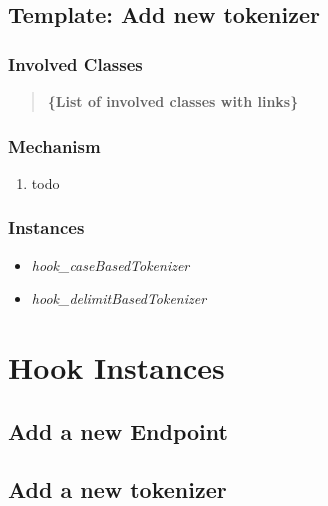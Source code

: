 \documentclass[letterpaper,10pt,english]{sphinxmanual}
\begin{document}
\section{Template: Add new tokenizer}
\label{docs/hooks/t_tokenizer::doc}\label{docs/hooks/t_tokenizer:hook-template-uss}\label{docs/hooks/t_tokenizer:template-add-new-tokenizer}

\subsection{Involved Classes}
\label{docs/hooks/t_tokenizer:involved-classes}\begin{quote}

\textbf{\{List of involved classes with links\}}
\end{quote}


\subsection{Mechanism}
\label{docs/hooks/t_tokenizer:mechanism}\begin{enumerate}
\item {} 
todo

\end{enumerate}


\subsection{Instances}
\label{docs/hooks/t_tokenizer:instances}\begin{itemize}
\item {} 
\emph{hook\_caseBasedTokenizer}

\item {} 
\emph{hook\_delimitBasedTokenizer}

\end{itemize}


\chapter{Hook Instances}
\label{index:hook-instances}

\section{Add a new Endpoint}
\label{docs/hooks/new_endpoint::doc}\label{docs/hooks/new_endpoint:add-a-new-endpoint}

\section{Add a new tokenizer}
\label{docs/hooks/new_tokenizer::doc}\label{docs/hooks/new_tokenizer:add-a-new-tokenizer}
\end{document}
